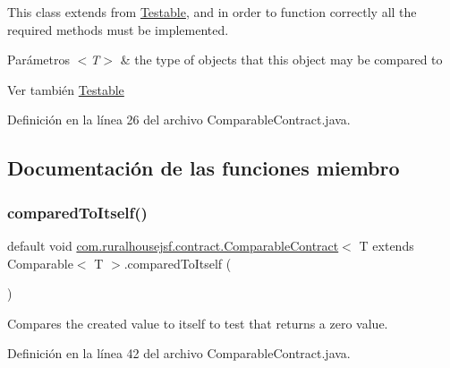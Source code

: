This class extends from \mbox{\hyperlink{interfacecom_1_1ruralhousejsf_1_1contract_1_1_testable}{Testable}}, and in order to function correctly all the required methods must be implemented.


\begin{DoxyParams}{Parámetros}
{\em $<$\+T$>$} & the type of objects that this object may be compared to\\
\hline
\end{DoxyParams}
\begin{DoxySeeAlso}{Ver también}
\mbox{\hyperlink{interfacecom_1_1ruralhousejsf_1_1contract_1_1_testable}{Testable}} 
\end{DoxySeeAlso}


Definición en la línea 26 del archivo Comparable\+Contract.\+java.



\subsection{Documentación de las funciones miembro}
\mbox{\label{interfacecom_1_1ruralhousejsf_1_1contract_1_1_comparable_contract_ad21966d20e5fffd0fa13cd021c262f11}} 
\subsubsection{\texorpdfstring{comparedToItself()}{comparedToItself()}}
{\footnotesize\ttfamily default void \mbox{\hyperlink{interfacecom_1_1ruralhousejsf_1_1contract_1_1_comparable_contract}{com.\+ruralhousejsf.\+contract.\+Comparable\+Contract}}$<$ T extends Comparable$<$ T $>$.compared\+To\+Itself (\begin{DoxyParamCaption}{ }\end{DoxyParamCaption})}

Compares the created value to itself to test that returns a zero value. 

Definición en la línea 42 del archivo Comparable\+Contract.\+java.

\mbox{\label{interfacecom_1_1ruralhousejsf_1_1contract_1_1_comparable_contract_aceb2f65e9d26e521c6dc0eb2cbe6a35d}} 
